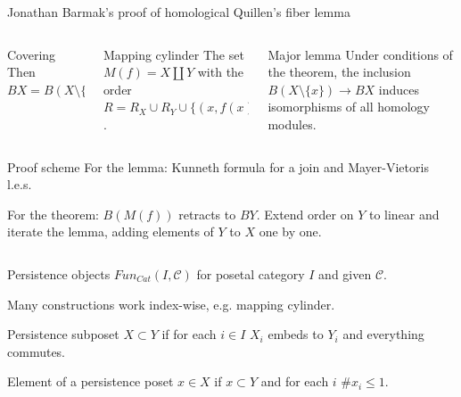 \documentclass[usenames,dvipsnames]{beamer}
\begin{document}
\begin{frame}{}
\begin{tcolorbox}[ size=tight,oversize,sharp corners
                     , colback=taspruce,colframe=ta2aluminium,left=56pt,right=90pt,bottom=20pt
                     ]
\begin{minipage}{0.97\paperwidth}
\begin{block}{\large Jonathan Barmak's proof of homological Quillen's fiber lemma}
\begin{minipage}{0.97\linewidth}
\begin{columns}[t]
\begin{column}{.27\linewidth}
\begin{block}{Covering}
          Then $BX = B(X \setminus \{x\}) \cup \left|\operatorname{st}(\mathcal{N}(x))\right|$
        \end{block}
      \end{column}
      \begin{column}{.30\linewidth}
        \begin{block}{Mapping cylinder}
          The set $M(f) = X \coprod Y$ with the order $R = R_X \cup R_Y \cup \{(x,f(x))\;|\;\forall x \in X\}$.
        \end{block}
      \end{column}
      \begin{column}{.42\linewidth}
        \begin{block}{Major lemma}
          Under conditions of the theorem, the inclusion $B(X \setminus \{x\}) \to BX$ induces isomorphisms of all homology modules.
        \end{block}
      \end{column}
    \end{columns}
    \begin{block}{Proof scheme}
      For the lemma: Kunneth formula for a join and Mayer-Vietoris l.e.s.\par
      For the theorem: $B(M(f))$ retracts to $BY$. Extend order on $Y$ to linear and iterate the lemma, adding elements of $Y$ to $X$ one by one.
    \end{block}
      \end{minipage}
    \end{block}
    \end{minipage}
    \end{tcolorbox}
    \begin{columns}[t]
        \begin{column}{.22\linewidth}
            \begin{block}{Persistence objects}
              $Fun_{Cat}(I, \mathcal{C})$ for posetal category $I$ and given $\mathcal{C}$.\par
              {\small Many constructions work index-wise, e.g. mapping cylinder.}\par
            \end{block}
            \begin{block}{Persistence subposet}
              $X \subset Y$ if for each $i \in I$ $X_i$ embeds to $Y_i$ and everything commutes.
            \end{block}
            \begin{block}{Element of a persistence poset}
              $x \in X$ if $x \subset Y$ and for each $i$ $\#x_i \leq 1$.\par

\end{block}
\end{column}
\end{columns}
\end{frame}
\end{document}
